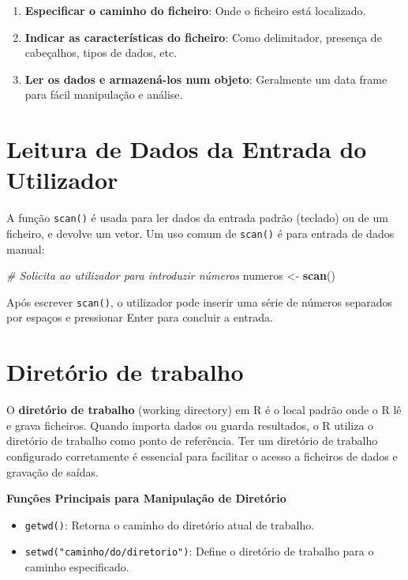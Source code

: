 \documentclass[
]{book}
\newenvironment{Shaded}{\begin{snugshade}}{\end{snugshade}}
\newcommand{\CommentTok}[1]{\textcolor[rgb]{0.56,0.35,0.01}{\textit{#1}}}
\newcommand{\FunctionTok}[1]{\textcolor[rgb]{0.13,0.29,0.53}{\textbf{#1}}}
\newcommand{\NormalTok}[1]{#1}
\newcommand{\OtherTok}[1]{\textcolor[rgb]{0.56,0.35,0.01}{#1}}
\providecommand{\tightlist}{%
  \setlength{\itemsep}{0pt}\setlength{\parskip}{0pt}}
\begin{document}
\begin{enumerate}
\def\labelenumi{\arabic{enumi}.}
\tightlist
\item
  \textbf{Especificar o caminho do ficheiro}: Onde o ficheiro está
  localizado.
\item
  \textbf{Indicar as características do ficheiro}: Como delimitador,
  presença de cabeçalhos, tipos de dados, etc.
\item
  \textbf{Ler os dados e armazená-los num objeto}: Geralmente um data frame
  para fácil manipulação e análise.
\end{enumerate}

\section{Leitura de Dados da Entrada do Utilizador}\label{leitura-de-dados-da-entrada-do-utilizador}

A função \texttt{scan()} é usada para ler dados da entrada padrão (teclado) ou
de um ficheiro, e devolve um vetor. Um uso comum de \texttt{scan()} é para
entrada de dados manual:

\begin{Shaded}
\begin{Highlighting}[]
\CommentTok{\# Solicita ao utilizador para introduzir números}
\NormalTok{numeros }\OtherTok{\textless{}{-}} \FunctionTok{scan}\NormalTok{()}
\end{Highlighting}
\end{Shaded}

Após escrever \texttt{scan()}, o utilizador pode inserir uma série de números
separados por espaços e pressionar Enter para concluir a entrada.

\section{Diretório de trabalho}\label{diretuxf3rio-de-trabalho}

O \textbf{diretório de trabalho} (working directory) em R é o local padrão
onde o R lê e grava ficheiros. Quando importa dados ou guarda
resultados, o R utiliza o diretório de trabalho como ponto de
referência. Ter um diretório de trabalho configurado corretamente é
essencial para facilitar o acesso a ficheiros de dados e gravação de
saídas.

\textbf{Funções Principais para Manipulação de Diretório}

\begin{itemize}
\tightlist
\item
  \texttt{getwd()}: Retorna o caminho do diretório atual de trabalho.
\item
  \texttt{setwd("caminho/do/diretorio")}: Define o diretório de trabalho para
  o caminho especificado.
\end{itemize}
\end{document}
